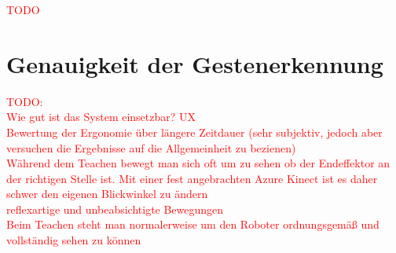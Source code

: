 \textcolor{red}{TODO}

\section{Genauigkeit der Gestenerkennung}



\textcolor{red}{TODO:\\
Wie gut ist das System einsetzbar? UX\\
Bewertung der Ergonomie über längere Zeitdauer (sehr subjektiv, jedoch aber versuchen die Ergebnisse auf die Allgemeinheit zu bezienen)\\
Während dem Teachen bewegt man sich oft um zu sehen ob der Endeffektor an der richtigen Stelle ist. Mit einer fest angebrachten Azure Kinect ist es daher schwer den eigenen Blickwinkel zu ändern\\
reflexartige und unbeabsichtigte Bewegungen\\
Beim Teachen steht man normalerweise um den Roboter ordnungsgemäß und vollständig sehen zu können
}


